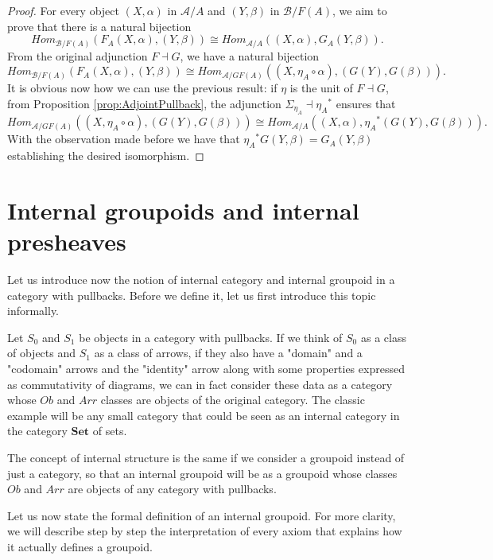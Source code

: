 \begin{lemma}
    \begin{proof} 
        For every object $(X,\alpha)$ in $\mathcal{A}/A$ and $(Y,\beta)$ in $\mathcal{B}/F(A)$, we aim to prove that there is a natural bijection
        \[ Hom_{\mathcal{B}/F(A)}(F_A(X,\alpha),(Y,\beta)) \cong Hom_{\mathcal{A}/A}((X,\alpha), G_A(Y,\beta)). \]
        From the original adjunction $F\dashv G$, we have a natural bijection
        \[ Hom_{\mathcal{B}/F(A)}(F_A(X,\alpha),(Y,\beta)) \cong Hom_{\mathcal{A}/GF(A)}((X,\eta_A\circ\alpha), (G(Y),G(\beta))). \]
        It is obvious now how we can use the previous result: if $\eta$ is the unit of $F\dashv G$, from Proposition \ref{prop:AdjointPullback}, the adjunction $\Sigma_{\eta_A}\dashv{\eta_A}^*$ ensures that
        \[ Hom_{\mathcal{A}/GF(A)}((X,\eta_A\circ\alpha), (G(Y),G(\beta))) \cong Hom_{\mathcal{A}/A}((X,\alpha), {\eta_A}^*(G(Y),G(\beta))). \]
        With the observation made before we have that ${\eta_A}^*G(Y,\beta) = G_A(Y,\beta)$ establishing the desired isomorphism.
    \end{proof}
\end{lemma}


\section{Internal groupoids and internal presheaves}
\label{sec:groupoids_presheaves}
Let us introduce now the notion of internal category and internal groupoid in a category with pullbacks. Before we define it, let us first introduce this topic informally. 

Let $S_0$ and $S_1$ be objects in a category with pullbacks. If we think of $S_0$ as a class of objects and $S_1$ as a class of arrows, if they also have a "domain" and a "codomain" arrows and the "identity" arrow along with some properties expressed as commutativity of diagrams, we can in fact consider these data as a category whose $Ob$ and $Arr$ classes are objects of the original category. The classic example will be any small category that could be seen as an internal category in the category $\textbf{Set}$ of sets.

The concept of internal structure is the same if we consider a groupoid instead of just a category, so that an internal groupoid will be as a groupoid whose classes $Ob$ and $Arr$ are objects of any category with pullbacks. 

Let us now state the formal definition of an internal groupoid. For more clarity, we will describe step by step the interpretation of every axiom that explains how it actually defines a groupoid.

